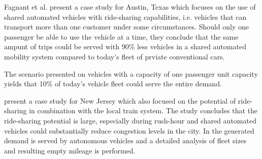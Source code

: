 
Fagnant et al. \cite{fagnant2015dynamic} present a case study for Austin, Texas
which focuses on the use of shared automated vehicles with ride-sharing capabilities,
i.e. vehicles that can transport more than one customer under some circumstances. Should only one passenger be able to use the vehicle at a time, they conclude that the same ampunt of trips could be served with 90\% less vehicles in a shared automated mobility system compared to today's fleet of prviate conventional cars.

The scenario presented on vehicles with a capacity of one passenger unit capacity yields that 10\% of today's
vehicle fleet could serve the entire demand. %

\cite{zachariah2014uncongested} present a case study for New Jersey which also focused
on the potential of ride-sharing in combination with the local train system.
The study concludes that the ride-sharing potential
is large, especially during rush-hour and shared automated vehicles could substantially
reduce congestion levels in the city. In \cite{zhu2017interplay} the generated
demand is served by autonomous vehicles and a detailed analysis of fleet sizes and
resulting empty mileage is performed.


